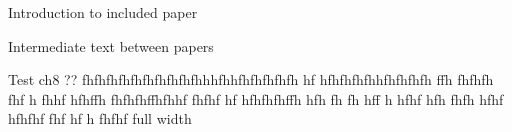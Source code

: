 \begin{refsection}

Introduction to included paper



Intermediate text between papers

%


Test ch8 ?? fhfhfhfhfhfhfhfhfhfhhhfhhfhfhfhfhfh hf hfhfhfhfhhfhfhfhfh ffh fhfhfh fhf h fhhf hfhffh fhfhfhffhfhhf  fhfhf hf  hfhfhfhffh  hfh fh fh hff h hfhf hfh fhfh hfhf hfhfhf fhf hf h fhfhf full width


%

\cite{west_two-dimensional_2020}

\printbibliography
\end{refsection}
